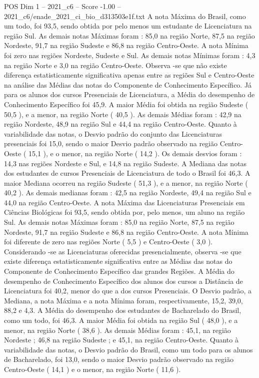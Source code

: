 \begin{textsample}{POS Dim 1 – 2021\_c6 – Score -1.00 – 2021\_c6/enade\_2021\_ci\_bio\_d313503e1f.txt}
A nota Máxima do Brasil, como um todo, foi 93,5, sendo obtida por pelo menos um estudante de Licenciatura na região Sul.
As demais notas Máximas foram : 85,0 na região Norte, 87,5 na região Nordeste, 91,7 na região Sudeste e 86,8 na região Centro-Oeste.
A nota Mínima foi zero nas regiões Nordeste, Sudeste e Sul.
As demais notas Mínimas foram : 4,3 na região Norte e 3,0 na região Centro-Oeste.
Observa -se que não existe diferença estatisticamente significativa apenas entre as regiões Sul e Centro-Oeste na análise das Médias das notas do Componente de Conhecimento Específico.
Já para os alunos dos cursos Presenciais de Licenciatura, a Média do desempenho de Conhecimento Específico foi 45,9.
A maior Média foi obtida na região Sudeste ( 50,5 ), e a menor, na região Norte ( 40,5 ).
As demais Médias foram : 42,9 na região Nordeste, 48,9 na região Sul e 44,4 na região Centro-Oeste.
Quanto à variabilidade das notas, o Desvio padrão do conjunto das Licenciaturas presenciais foi 15,0, sendo o maior Desvio padrão observado na região Centro-Oeste ( 15,1 ), e o menor, na região Norte ( 14,2 ).
Os demais desvios foram : 14,3 nas regiões Nordeste e Sul, e 14,8 na região Sudeste.
A Mediana das notas dos estudantes de cursos Presenciais de Licenciatura de todo o Brasil foi 46,3.
A maior Mediana ocorreu na região Sudeste ( 51,3 ), e a menor, na região Norte ( 40,2 ).
As demais medianas foram : 42,5 na região Nordeste, 49,4 na região Sul e 44,0 na região Centro-Oeste.
A nota Máxima das Licenciaturas Presenciais em Ciências Biológicas foi 93,5, sendo obtida por, pelo menos, um aluno na região Sul.
As demais notas Máximas foram : 85,0 na região Norte, 87,5 na região Nordeste, 91,7 na região Sudeste e 86,8 na região Centro-Oeste.
A nota Mínima foi diferente de zero nas regiões Norte ( 5,5 ) e Centro-Oeste ( 3,0 ).
Considerando -se as Licenciaturas oferecidas presencialmente, observa -se que existe diferença estatisticamente significativa entre as Médias das notas do Componente de Conhecimento Específico das grandes Regiões.
A Média do desempenho de Conhecimento Específico dos alunos dos cursos a Distância de Licenciatura foi 40,2, menor do que a dos cursos Presenciais.
O Desvio padrão, a Mediana, a nota Máxima e a nota Mínima foram, respectivamente, 15,2, 39,0, 88,2 e 4,3.
A Média do desempenho dos estudantes de Bacharelado do Brasil, como um todo, foi 46,3.
A maior Média foi obtida na região Sul ( 48,0 ), e a menor, na região Norte ( 38,6 ).
As demais Médias foram : 45,1, na região Nordeste ; 46,8 na região Sudeste ; e 45,1, na região Centro-Oeste.
Quanto à variabilidade das notas, o Desvio padrão do Brasil, como um todo para os alunos de Bacharelado, foi 13,0, sendo o maior Desvio padrão observado na região Centro-Oeste ( 14,1 ) e o menor, na região Norte ( 11,6 ).

\end{textsample}
